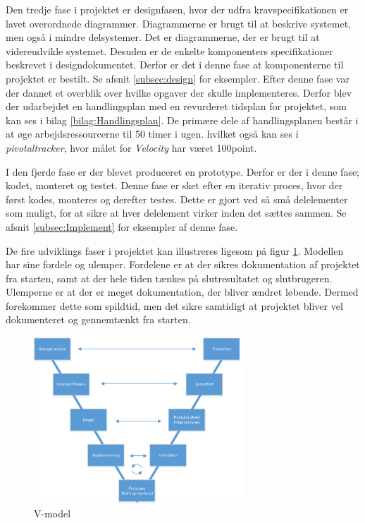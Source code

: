 Den tredje fase i projektet er designfasen, hvor der udfra kravspecifikationen er lavet overordnede diagrammer. Diagrammerne er brugt til at beskrive systemet, men også i mindre delsystemer. Det er diagrammerne, der er brugt til at videreudvikle systemet. Desuden er de enkelte komponenters specifikationer beskrevet i designdokumentet. Derfor er det i denne fase at komponenterne til projektet er bestilt. Se afsnit \ref{subsec:design} for eksempler. Efter denne fase var der dannet et overblik over hvilke opgaver der skulle implementeres. Derfor blev der udarbejdet en handlingsplan med en revurderet tidsplan for projektet, som kan ses i bilag \ref{bilag:Handlingsplan}. De primære dele af handlingsplanen består i at øge arbejdsressourcerne til 50 timer i ugen. hvilket også kan ses i \textit{pivotaltracker}, hvor målet for \textit{Velocity} har været 100point. 

I den fjerde fase er der blevet produceret en prototype. Derfor er der i denne fase; kodet, monteret og testet. Denne fase er sket efter en iterativ proces, hvor der først kodes, monteres og derefter testes. Dette er gjort ved så små delelementer som muligt, for at sikre at hver delelement virker inden det sættes sammen. Se afsnit \ref{subsec:Implement} for eksempler af denne fase. 

De fire udviklings faser i projektet kan illustreres ligesom på figur \ref{fig:v-model}. Modellen har sine fordele og ulemper. Fordelene er at der sikres dokumentation af projektet fra starten, samt at der hele tiden tænkes på slutresultatet og slutbrugeren. Ulemperne er at der er meget dokumentation, der bliver ændret løbende. Dermed forekommer dette som spildtid, men det sikre samtidigt at projektet bliver vel dokumenteret og gennemtænkt fra starten.

\begin{figure}[H]
	\centering
	\includegraphics[width=0.7\textwidth]{billeder/Hovedrapport/V-model.PDF}
	\caption{V-model}
	\label{fig:v-model}
\end{figure}

